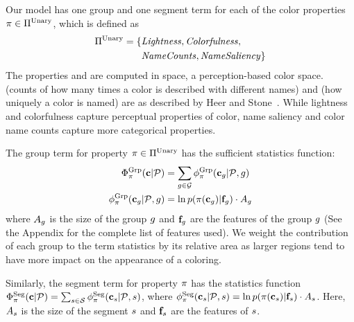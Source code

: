 Our model has one group and one segment term for each of the color properties $ \pi \in \Pi^{\textrm{Unary}}$, which is defined as
\begin{align*}
\Pi^{\textrm{Unary}} = \{ &\text{\emph{Lightness}}, \text{\emph{Colorfulness}}, \\
                 &\text{\emph{NameCounts}}, \text{\emph{NameSaliency}} \}
\end{align*}
The properties  and  are computed in \lab space, a perception-based color space.  (counts of how many times a color is described with different names) and  (how uniquely a color is named) are as described by Heer and Stone~. While lightness and colorfulness capture perceptual properties of color, name saliency and color name counts capture more categorical properties.

The group term for property $\pi \in \Pi^{\textrm{Unary}}$ has the sufficient statistics function:
\begin{align*}
 \Phi^{\textrm{Grp}}_\pi(\mathbf{c}|\mathcal{P}) &= \sum_{g \in \mathcal{G}} \phi^{\textrm{Grp}}_\pi(\mathbf{c}_g | \mathcal{P}, g) \\
 \phi^{\textrm{Grp}}_\pi(\mathbf{c}_g | \mathcal{P}, g) &=  \ln p( \pi( \mathbf{c}_g ) | \mathbf{f}_g ) \cdot A_g
\end{align*}
where $A_g$ is the size of the group $g$ and $\mathbf{f}_g$ are the features of the group $g$ (See the Appendix for the complete list of features used). We weight the contribution of each group to the term statistics by its relative area as larger regions tend to have more impact on the appearance of a coloring.

Similarly, the segment term for property $\pi$ has the statistics function $\Phi^{\textrm{Seg}}_\pi(\mathbf{c}|\mathcal{P}) = \sum_{s \in \mathcal{S}} \phi^{\textrm{Seg}}_\pi(\mathbf{c}_s | \mathcal{P}, s)$, where $\phi^{\textrm{Seg}}_\pi(\mathbf{c}_s | \mathcal{P}, s) = \ln p( \pi( \mathbf{c}_s ) | \mathbf{f}_s) \cdot A_s$. Here, $A_s$ is the size of the segment $s$ and $\mathbf{f}_s$ are the features of $s$.

%
%

